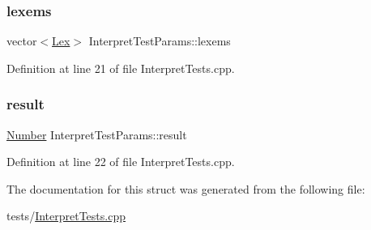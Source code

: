 \subsubsection{\texorpdfstring{lexems}{lexems}}
{\footnotesize\ttfamily vector$<$\hyperlink{classteam22_1_1_calc_1_1_lex}{Lex}$>$ Interpret\+Test\+Params\+::lexems}



Definition at line 21 of file Interpret\+Tests.\+cpp.

\mbox{\label{struct_interpret_test_params_a47453b7066c4a8ffa209157af91e7ae7}} 
\subsubsection{\texorpdfstring{result}{result}}
{\footnotesize\ttfamily \hyperlink{classteam22_1_1_math_1_1_number}{Number} Interpret\+Test\+Params\+::result}



Definition at line 22 of file Interpret\+Tests.\+cpp.



The documentation for this struct was generated from the following file\+:\begin{DoxyCompactItemize}
\item 
tests/\hyperlink{_interpret_tests_8cpp}{Interpret\+Tests.\+cpp}\end{DoxyCompactItemize}
